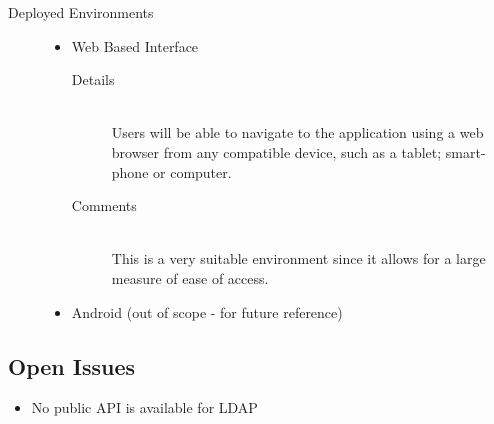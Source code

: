 \documentclass[10pt]{article}
\begin{document}
\begin{description}
\begin{itemize}
\begin{description}
					\end{description}
			\end{itemize}	
		\item[Deployed Environments] \hfill 
			\begin{itemize}
				\item Web Based Interface
					\begin{description}
						\item[Details] \hfill \\
							Users will be able to navigate to the application using a web browser from any compatible device, such as a tablet; smart-phone or computer.
						\item[Comments]\hfill \\
							This is a very suitable environment since it allows for a large measure of ease of access.
					\end{description}
				\item Android (out of scope - for future reference)

			\end{itemize}
\end{description}	

\subsection{Open Issues}
\begin{itemize}
\item No public API is available for LDAP
\end{itemize}
\end{document}
